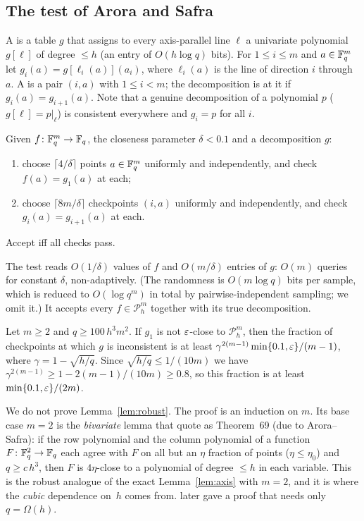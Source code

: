 \subsection{The test of Arora and Safra}

A  is a table $g$ that assigns to every axis-parallel line $\ell$ a univariate polynomial $g[\ell]$ of degree $\le h$ (an entry of $O(h\log q)$ bits).  For $1\le i\le m$ and
$a\in\mathbb{F}_q^m$ let $g_i(a)=g[\ell_i(a)](a_i)$, where $\ell_i(a)$ is the line of direction $i$ through $a$.  A  is a pair $(i,a)$ with $1\le i<m$; the decomposition is  at it if
$g_i(a)=g_{i+1}(a)$.  Note that a genuine decomposition of a polynomial $p$ ($g[\ell]=p|_\ell$) is consistent everywhere and $g_i=p$ for all $i$.

\begin{definition}\label{def:ldt}
Given $f\colon\mathbb{F}_q^m\to\mathbb{F}_q$, the closeness parameter $\delta<0.1$ and a decomposition $g$:
\begin{enumerate}[label=(\roman*)]
  \item choose $\lceil4/\delta\rceil$ points $a\in\mathbb{F}_q^m$ uniformly and independently, and check $f(a)=g_1(a)$ at each;
  \item choose $\lceil8m/\delta\rceil$ checkpoints $(i,a)$ uniformly and independently, and check $g_i(a)=g_{i+1}(a)$ at each.
\end{enumerate}
Accept iff all checks pass.
\end{definition}

\noindent
The test reads $O(1/\delta)$ values of $f$ and $O(m/\delta)$ entries of $g$: $O(m)$ queries for constant $\delta$, non-adaptively.  (The randomness is $O(m\log q)$ bits per sample, which is reduced to $O(\log q^m)$ in total
by pairwise-independent sampling; we omit it.)  It accepts every $f\in\mathcal P^m_h$ together with its true decomposition.

\begin{lemma}\label{lem:robust}
Let $m\ge2$ and $q\ge100\,h^3m^2$.  If $g_1$ is not $\varepsilon$-close to $\mathcal P^m_h$, then the fraction of checkpoints at which $g$ is inconsistent is at least
$\gamma^{2(m-1)}\min\{0.1,\varepsilon\}/(m-1)$, where $\gamma=1-\sqrt{h/q}$.  Since $\sqrt{h/q}\le1/(10m)$ we have $\gamma^{2(m-1)}\ge1-2(m-1)/(10m)\ge0.8$, so this fraction is at least $\min\{0.1,\varepsilon\}/(2m)$.
\end{lemma}

\noindent
We do not prove Lemma~\ref{lem:robust}.  The proof is an induction on $m$.  Its base case $m=2$ is the \emph{bivariate} lemma that \citet{ALMSS98} quote as Theorem~69 (due to Arora--Safra): if the row polynomial and the column polynomial of a
function $F\colon\mathbb{F}_q^2\to\mathbb{F}_q$ each agree with $F$ on all but an $\eta$ fraction of points ($\eta\le\eta_0$) and $q\ge c\,h^3$, then $F$ is $4\eta$-close to a polynomial of degree $\le h$ in each variable.  This is the robust analogue
of the exact Lemma~\ref{lem:axis} with $m=2$, and it is where the \emph{cubic} dependence on~$h$ comes from.  \citet{PolishchukSpielman94} later gave a proof that needs only $q=\Omega(h)$.

